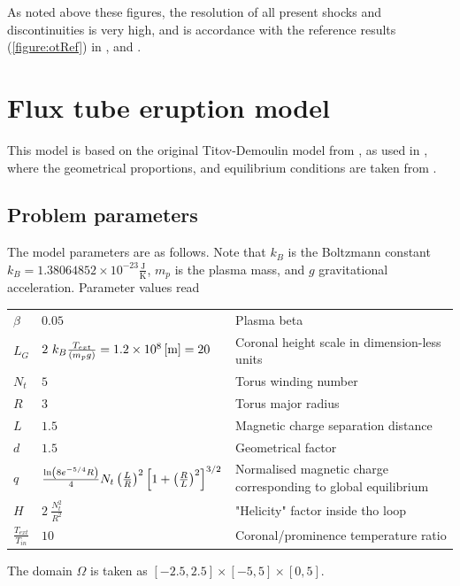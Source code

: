 As noted above these figures, the resolution of all present shocks and discontinuities is very high, and is accordance with the reference results (\cref{figure:otRef}) in \cite{blast1}, and \cite{blast0}.

\section{Flux tube eruption model}
This model is based on the original Titov-Demoulin model from \cite{td}, as used in \cite{miraClanek}, where the geometrical proportions, and equilibrium conditions are taken from \cite{td}.
\subsection{Problem parameters}
The model parameters are as follows. Note that $k_B$ is the Boltzmann constant $k_B = 1.38064852 \times 10^{-23} \frac{\mathrm{J}}{\mathrm{K}}$, $m_p$ is the plasma mass, and $g$ gravitational acceleration. Parameter values read
\begin{table}[H]
\begin{tabular}{llp{6cm}}
$\beta$ & $0.05$ & Plasma beta \\
$L_G$ & $2\ k_B \frac{T_{ext}}{\left( m_p g \right)} = 1.2 \times 10^8 \left[\text{m}\right] = 20$ & Coronal height scale in dimension-less units \\
$N_t$ & $5$ & Torus winding number \\
$R$ & $3$ & Torus major radius \\
$L$ & $1.5$ & Magnetic charge separation distance \\
$d$ & $1.5$ & Geometrical factor \\
$q$ & $\frac{\ln\left( 8 e^{-5/4} R\right)}{4} N_t \left(\frac{L}{R}\right)^2\left[1 + \left(\frac{R}{L}\right)^2\right]^{3/2}$ & Normalised magnetic charge corresponding to global equilibrium \\
$H$ & $2\ \frac{N_t^2}{R^2}$ & "Helicity" factor inside tho loop \\
$\frac{ T_{ext} }{T_{in}}$ & $10$  & Coronal/prominence temperature ratio
\end{tabular}
\end{table}
The domain $\Omega$ is taken as $\left[-2.5, 2.5\right] \times \left[-5, 5\right] \times \left[0, 5\right]$.
